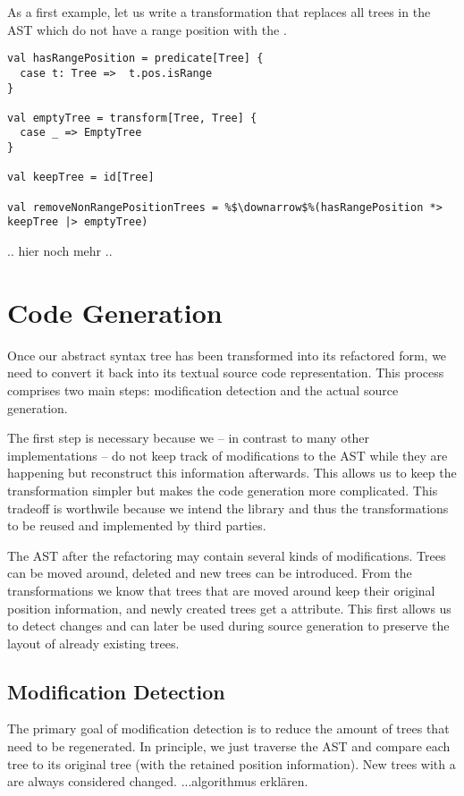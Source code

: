\documentclass[10pt,a4paper,oneside]{scrreprt}
\begin{document}
As a first example, let us write a transformation that replaces all trees in the AST which do not have a range position with the .

\begin{lstlisting}
val hasRangePosition = predicate[Tree] {
  case t: Tree =>  t.pos.isRange
}

val emptyTree = transform[Tree, Tree] {
  case _ => EmptyTree
}

val keepTree = id[Tree]

val removeNonRangePositionTrees = %$\downarrow$%(hasRangePosition *> keepTree |> emptyTree)
\end{lstlisting}

.. hier noch mehr ..


\section{Code Generation}

Once our abstract syntax tree has been transformed into its refactored form, we need to convert it back into its textual source code representation. This process comprises two main steps: modification detection and the actual source generation.

The first step is necessary because we -- in contrast to many other implementations -- do not keep track of modifications to the AST while they are happening but reconstruct this information afterwards. This allows us to keep the transformation simpler but makes the code generation more complicated. This tradeoff is worthwile because we intend the library and thus the transformations to be reused and implemented by third parties.

The AST after the refactoring may contain several kinds of modifications. Trees can be moved around, deleted and new trees can be introduced. From the transformations we know that trees that are moved around keep their original position information, and newly created trees get a  attribute. This first allows us to detect changes and can later be used during source generation to preserve the layout of already existing trees. 

\subsection{Modification Detection}

The primary goal of modification detection is to reduce the amount of trees that need to be regenerated. In principle, we just traverse the AST and compare each tree to its original tree (with the retained position information). New trees with a  are always considered changed. ...algorithmus erklären.
\end{document}
